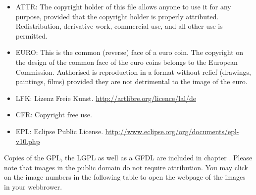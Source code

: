\documentclass[fontsize=11pt,paper=A4,BCOR=12mm,DIV=13,open=any,listof=totoc,toc=flat]{scrbook}
\begin{document}
\begin{itemize}
\item ATTR:  The copyright holder of this file allows anyone to use it for any purpose, provided that the copyright holder is properly attributed. Redistribution, derivative work, commercial use, and all other use is permitted. 
\item EURO: This is the common (reverse) face of a euro coin. The copyright on the design of the common face of the euro coins belongs to the European Commission. Authorised is reproduction in a format without relief (drawings, paintings, films) provided they are not detrimental to the image of the euro.
\item LFK: Lizenz Freie Kunst. \url{http://artlibre.org/licence/lal/de} 
\item CFR: Copyright free use. 
\item EPL: Eclipse Public License. \url{http://www.eclipse.org/org/documents/epl-v10.php} 
\end{itemize}
Copies of the GPL, the LGPL as well as a GFDL are included in chapter . Please note that images in the public domain do not require attribution. You may click on the image numbers in the following table to open the webpage of the images in your webbrower.
\pagebreak
\small
\begin{longtable}{|p{}|p{}|p{}|}
\hline

\end{longtable}
\pagebreak\pagebreak

\printindex

\pagebreak
\end{document}
